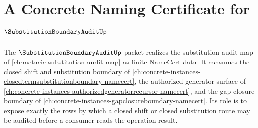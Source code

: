 \chapter{A Concrete Naming Certificate for $\SubstitutionBoundaryAuditUp$}
\label{ch:concrete-instances-substitutionboundaryaudit-namecert}

The $\SubstitutionBoundaryAuditUp$ packet realizes the substitution audit map of \autoref{ch:metacic-substitution-audit-map} as finite NameCert data. It consumes the closed shift and substitution boundary of \autoref{ch:concrete-instances-closedtermsubstitutionboundary-namecert}, the authorized generator surface of \autoref{ch:concrete-instances-authorizedgeneratorrecursor-namecert}, and the gap-closure boundary of \autoref{ch:concrete-instances-gapclosureboundary-namecert}. Its role is to expose exactly the rows by which a closed shift or closed substitution route may be audited before a consumer reads the operation result.

